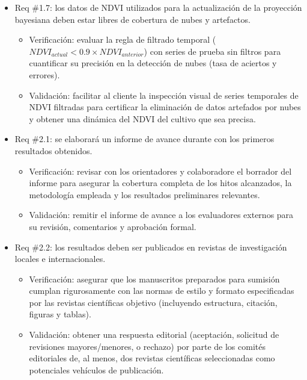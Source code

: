 \documentclass[
11pt, %
]{charter}
\begin{document}
\begin{itemize}
    \item Req \#1.7: los datos de NDVI utilizados para la actualización de la proyección bayesiana deben estar libres de cobertura de nubes y artefactos.
    \begin{itemize}
        \item Verificación: evaluar la regla de filtrado temporal ($NDVI_{actual} < 0.9 \times NDVI_{anterior}$) con series de prueba sin filtros para cuantificar su precisión en la detección de nubes (tasa de aciertos y errores).
        \item Validación: facilitar al cliente la inspección visual de series temporales de NDVI filtradas para certificar la eliminación de datos artefados por nubes y obtener una dinámica del NDVI del cultivo que sea precisa.
    \end{itemize}

    \item Req \#2.1: se elaborará un informe de avance durante con los primeros resultados obtenidos.
    \begin{itemize}
        \item Verificación: revisar con los orientadores y colaboradore el borrador del informe para asegurar la cobertura completa de los hitos alcanzados, la metodología empleada y los resultados preliminares relevantes.
        \item Validación: remitir el informe de avance a los evaluadores externos para su revisión, comentarios y aprobación formal.
    \end{itemize}

    \item Req \#2.2: los resultados deben ser publicados en revistas de investigación locales e internacionales.
    \begin{itemize}
        \item Verificación: asegurar que los manuscritos preparados para sumisión cumplan rigurosamente con las normas de estilo y formato especificadas por las revistas científicas objetivo (incluyendo estructura, citación, figuras y tablas).
        \item Validación: obtener una respuesta editorial (aceptación, solicitud de revisiones mayores/menores, o rechazo) por parte de los comités editoriales de, al menos, dos revistas científicas seleccionadas como potenciales vehículos de publicación.
    \end{itemize}


\end{itemize}
\end{document}
